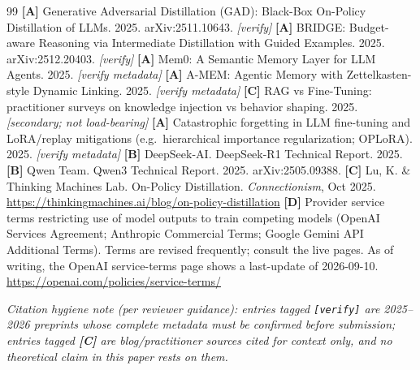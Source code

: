 \documentclass[11pt]{article}
\begin{document}
\begin{thebibliography}{99}
 \textbf{[A]} Generative Adversarial Distillation (GAD): Black-Box On-Policy Distillation of LLMs. 2025. arXiv:2511.10643. \emph{[verify]}
 \textbf{[A]} BRIDGE: Budget-aware Reasoning via Intermediate Distillation with Guided Examples. 2025. arXiv:2512.20403. \emph{[verify]}
 \textbf{[A]} Mem0: A Semantic Memory Layer for LLM Agents. 2025. \emph{[verify metadata]}
 \textbf{[A]} A-MEM: Agentic Memory with Zettelkasten-style Dynamic Linking. 2025. \emph{[verify metadata]}
 \textbf{[C]} RAG vs Fine-Tuning: practitioner surveys on knowledge injection vs behavior shaping. 2025. \emph{[secondary; not load-bearing]}
 \textbf{[A]} Catastrophic forgetting in LLM fine-tuning and LoRA/replay mitigations (e.g.\ hierarchical importance regularization; OPLoRA). 2025. \emph{[verify metadata]}
 \textbf{[B]} DeepSeek-AI. DeepSeek-R1 Technical Report. 2025.
 \textbf{[B]} Qwen Team. Qwen3 Technical Report. 2025. arXiv:2505.09388.
 \textbf{[C]} Lu, K. \& Thinking Machines Lab. On-Policy Distillation. \emph{Connectionism}, Oct 2025. \url{https://thinkingmachines.ai/blog/on-policy-distillation}
 \textbf{[D]} Provider service terms restricting use of model outputs to train competing models (OpenAI Services Agreement; Anthropic Commercial Terms; Google Gemini API Additional Terms). Terms are revised frequently; consult the live pages. As of writing, the OpenAI service-terms page shows a last-update of 2026-09-10. \url{https://openai.com/policies/service-terms/}

\end{thebibliography}

\noindent\emph{Citation hygiene note (per reviewer guidance): entries tagged \texttt{[verify]} are 2025--2026 preprints whose complete metadata must be confirmed before submission; entries tagged \textbf{[C]} are blog/practitioner sources cited for context only, and no theoretical claim in this paper rests on them.}

\appendix
\end{document}
